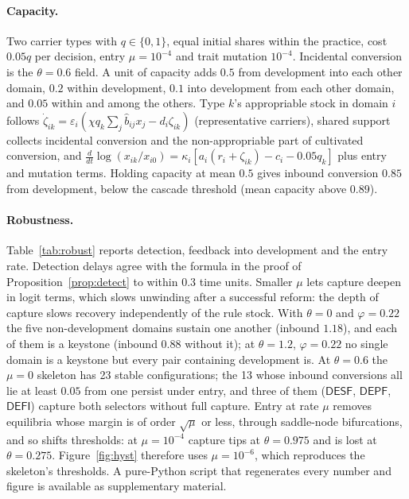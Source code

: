 \documentclass[letterpaper]{article} %
\theoremstyle{definition}
\newcommand{\dD}{\mathsf{D}}
\newcommand{\dE}{\mathsf{E}}
\newcommand{\dS}{\mathsf{S}}
\newcommand{\dP}{\mathsf{P}}
\newcommand{\dF}{\mathsf{F}}
\newcommand{\dI}{\mathsf{I}}
\begin{document}
\paragraph{Capacity.} Two carrier types with $q\in\{0,1\}$, equal initial shares within the practice, cost $0.05q$ per decision, entry $\mu=10^{-4}$ and trait mutation $10^{-4}$. Incidental conversion is the $\theta=0.6$ field. A unit of capacity adds $0.5$ from development into each other domain, $0.2$ within development, $0.1$ into development from each other domain, and $0.05$ within and among the others. Type $k$'s appropriable stock in domain $i$ follows $\dot\zeta_{ik}=\varepsilon_i(\chi q_k\sum_j\hat b_{ij}x_j-d_i\zeta_{ik})$ (representative carriers), shared support collects incidental conversion and the non-appropriable part of cultivated conversion, and $\frac{d}{dt}\log(x_{ik}/x_{i0})=\kappa_i[a_i(r_i+\zeta_{ik})-c_i-0.05q_k]$ plus entry and mutation terms. Holding capacity at mean $0.5$ gives inbound conversion $0.85$ from development, below the cascade threshold (mean capacity above $0.89$).

\paragraph{Robustness.} Table~\ref{tab:robust} reports detection, feedback into development and the entry rate. Detection delays agree with the formula in the proof of Proposition~\ref{prop:detect} to within $0.3$ time units. Smaller $\mu$ lets capture deepen in logit terms, which slows unwinding after a successful reform: the depth of capture slows recovery independently of the rule stock. With $\theta=0$ and $\varphi=0.22$ the five non-development domains sustain one another (inbound $1.18$), and each of them is a keystone (inbound $0.88$ without it); at $\theta=1.2$, $\varphi=0.22$ no single domain is a keystone but every pair containing development is. At $\theta=0.6$ the $\mu=0$ skeleton has 23 stable configurations; the 13 whose inbound conversions all lie at least $0.05$ from one persist under entry, and three of them ($\dD\dE\dS\dF$, $\dD\dE\dP\dF$, $\dD\dE\dF\dI$) capture both selectors without full capture. Entry at rate $\mu$ removes equilibria whose margin is of order $\sqrt\mu$ or less, through saddle-node bifurcations, and so shifts thresholds: at $\mu=10^{-4}$ capture tips at $\theta=0.975$ and is lost at $\theta=0.275$. Figure~\ref{fig:hyst} therefore uses $\mu=10^{-6}$, which reproduces the skeleton's thresholds. A pure-Python script that regenerates every number and figure is available as supplementary material.
\end{document}
